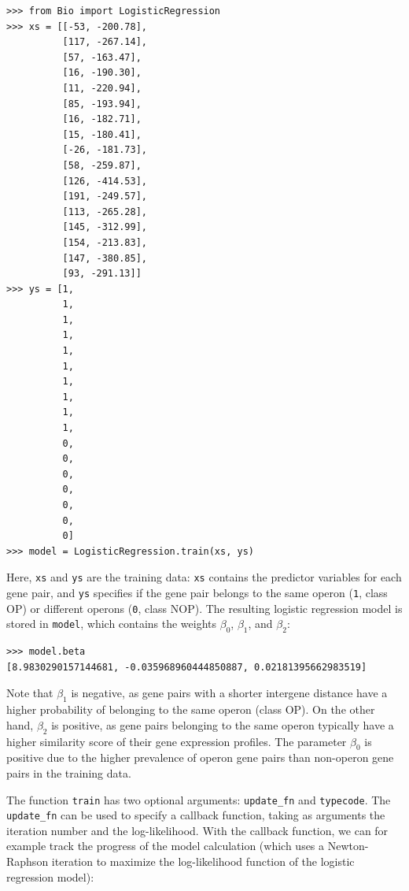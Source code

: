 \documentclass{report}
\begin{document}
\begin{verbatim}
>>> from Bio import LogisticRegression
>>> xs = [[-53, -200.78],
          [117, -267.14],
          [57, -163.47],
          [16, -190.30],
          [11, -220.94],
          [85, -193.94],
          [16, -182.71],
          [15, -180.41],
          [-26, -181.73],
          [58, -259.87],
          [126, -414.53],
          [191, -249.57],
          [113, -265.28],
          [145, -312.99],
          [154, -213.83],
          [147, -380.85],
          [93, -291.13]]
>>> ys = [1,
          1,
          1,
          1,
          1,
          1,
          1,
          1,
          1,
          1,
          0,
          0,
          0,
          0,
          0,
          0,
          0]
>>> model = LogisticRegression.train(xs, ys)
\end{verbatim}

Here, \verb+xs+ and \verb+ys+ are the training data: \verb+xs+ contains the predictor variables for each gene pair, and \verb+ys+ specifies if the gene pair belongs to the same operon (\verb+1+, class OP) or different operons (\verb+0+, class NOP). The resulting logistic regression model is stored in \verb+model+, which contains the weights $\beta_0$, $\beta_1$, and $\beta_2$:

\begin{verbatim}
>>> model.beta
[8.9830290157144681, -0.035968960444850887, 0.02181395662983519]
\end{verbatim}

Note that $\beta_1$ is negative, as gene pairs with a shorter intergene distance have a higher probability of belonging to the same operon (class OP). On the other hand, $\beta_2$ is positive, as gene pairs belonging to the same operon typically have a higher similarity score of their gene expression profiles.
The parameter $\beta_0$ is positive due to the higher prevalence of operon gene pairs than non-operon gene pairs in the training data.

The function \verb+train+ has two optional arguments: \verb+update_fn+ and \verb+typecode+. The \verb+update_fn+ can be used to specify a callback function, taking as arguments the iteration number and the log-likelihood. With the callback function, we can for example track the progress of the model calculation (which uses a Newton-Raphson iteration to maximize the log-likelihood function of the logistic regression model):
\end{document}
